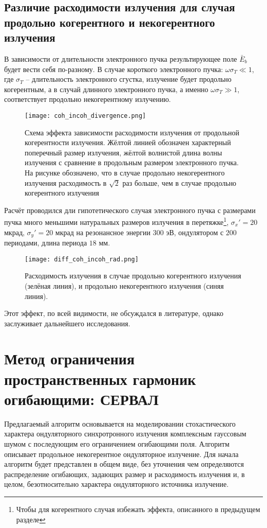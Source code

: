 \subsection{Различие расходимости излучения для случая продольно когерентного и некогерентного излучения}
В зависимости от длительности электронного пучка результирующее поле $\bar{E}_{b}$ будет вести себя по-разному. В случае короткого электронного пучка: $\omega \sigma_T \ll 1$, где $\sigma_T$ -- длительность электронного сгустка, излучение будет продольно когерентным, а в случай длинного электронного пучка, а именно  $\omega \sigma_T \gg 1$, соответствует продольно некогерентному излучению. 

\begin{figure}[H] 
	\centering 	\texttt{[image: coh\_incoh\_divergence.png]}
	\caption{Схема эффекта зависимости расходимости излучения от продольной когерентности излучения. Жёлтой линией обозначен характерный поперечный размер излучения, жёлтой волнистой длина волны излучения с сравнение в продольным размером электронного пучка. На рисунке обозначено, что в случае продольно некогерентного излучения расходимость в $\sqrt{2}$ раз больше, чем в случае продольно когерентного излучения}
	\label{fig:coh_incoh_divergence}
\end{figure}
Расчёт проводился дли гипотетического случая электронного пучка с размерами пучка много меньшими натуральных размеров излучения в перетяжке\footnote{Чтобы для когерентного случая избежать эффекта, описанного в предыдущем разделе}, $\sigma_x' = 20$ мкрад, $\sigma_y' = 20$ мкрад на резонансное энергии $300$ эВ, ондулятором с $200$ периодами, длина периода $18$ мм. 

\begin{figure}[H] 
	\centering 	\texttt{[image: diff\_coh\_incoh\_rad.png]}
	\caption{Расходимость излучения в случае продольно когерентного излучения (зелёная линия), и продольно некогерентного излучения (синяя линия).}
	\label{fig:diff_coh_incoh_rad}
\end{figure}
\noindent Этот эффект, по всей видимости, не обсуждался в литературе, однако заслуживает дальнейшего исследования.
\section{Метод ограничения пространственных гармоник огибающими: СЕРВАЛ}
Предлагаемый алгоритм основывается на моделировании стохастического характера ондуляторного синхротронного излучения комплексным гауссовым шумом с последующим его ограничением огибающими поля. Алгоритм описывает продольное некогерентное ондуляторное излучение. Для начала алгоритм будет представлен в общем виде, без уточнения чем определяются распределение огибающих, задающих размер и расходимость излучения и, в целом, безотносительно характера ондуляторного источника излучение. 
